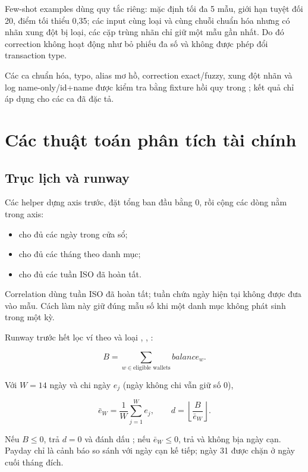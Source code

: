 Few-shot examples dùng quy tắc riêng: mặc định tối đa 5 mẫu, giới hạn tuyệt đối 20, điểm tối thiểu 0,35; các input cùng loại và cùng chuỗi chuẩn hóa nhưng có nhãn xung đột bị loại, các cặp trùng nhãn chỉ giữ một mẫu gần nhất. Do đó correction không hoạt động như bỏ phiếu đa số và không được phép đổi transaction type.

Các ca chuẩn hóa, typo, alias mơ hồ, correction exact/fuzzy, xung đột nhãn và log name-only/id+name được kiểm tra bằng fixture hồi quy trong ; kết quả chỉ áp dụng cho các ca đã đặc tả.

\section{Các thuật toán phân tích tài chính}
\label{app:analytics-algorithms}

\subsection{Trục lịch và runway}

Các helper dựng axis trước, đặt tổng ban đầu bằng 0, rồi cộng các dòng nằm trong axis:
\begin{itemize}
  \item {} cho đủ các ngày trong cửa sổ;
  \item {} cho đủ các tháng theo danh mục;
  \item {} cho đủ các tuần ISO đã hoàn tất.
\end{itemize}
Correlation dùng tuần ISO đã hoàn tất; tuần chứa ngày hiện tại không được đưa vào mẫu. Cách làm này giữ đúng mẫu số khi một danh mục không phát sinh trong một kỳ.

Runway trước hết lọc ví theo  và loại , , :

\begin{equation}
  B=\sum_{w\in\text{eligible wallets}} balance_w.
\end{equation}

Với $W=14$ ngày và chi ngày $e_j$ (ngày không chi vẫn giữ số 0),

\begin{equation}
  \bar e_W=\frac{1}{W}\sum_{j=1}^{W}e_j,
  \qquad d=\left\lfloor\frac{B}{\bar e_W}\right\rfloor.
\end{equation}

Nếu $B\leq0$, trả $d=0$ và đánh dấu ; nếu $\bar e_W\leq0$, trả  và không bịa ngày cạn. Payday chỉ là cảnh báo so sánh với ngày cạn kế tiếp; ngày 31 được chặn ở ngày cuối tháng đích.

